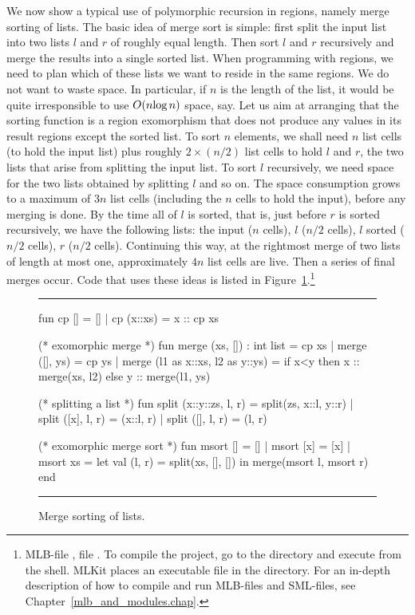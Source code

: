 \documentclass[12pt]{book}
\begin{document}
We now show a typical use of polymorphic recursion in regions, namely merge
sorting of lists. The basic idea of merge sort is simple: first split the input
list into two lists $l$ and $r$ of roughly equal length.  Then sort $l$ and $r$
recursively and merge the results into a single sorted list.  When programming
with regions, we need to plan which of these lists we want to reside in the same
regions. We do not want to waste space. In particular, if $n$ is the length of
the list, it would be quite irresponsible to use $O(n\hbox{log}\,n)$ space, say.
Let us aim at arranging that the sorting function is a region exomorphism that
does not produce any values in its result regions except the sorted list. To
sort $n$ elements, we shall need $n$ list cells (to hold the input list) plus
roughly $2\times(n/2)$ list cells to hold $l$ and $r$, the two lists that arise
from splitting the input list. To sort $l$ recursively, we need space for the
two lists obtained by splitting $l$ and so on. The space consumption grows to a
maximum of $3n$ list cells (including the $n$ cells to hold the input), before
any merging is done.  By the time all of $l$ is sorted, that is, just before $r$
is sorted recursively, we have the following lists: the input ($n$ cells), $l$
($n/2$ cells), $l$ sorted ($n/2$ cells), $r$ ($n/2$ cells). Continuing this way,
at the rightmost merge of two lists of length at most one, approximately $4n$
list cells are live.  Then a series of final merges occur.  Code that uses these
ideas is listed in
%
%
%
%
%
%
Figure~\ref{msort.fig}.\footnote{MLB-file , file
. To compile the project, go to the 
directory and execute  from the shell. MLKit places
an executable file  in the  directory. For an
in-depth description of how to compile and run MLB-files and SML-files, see
Chapter~\ref{mlb_and_modules.chap}.}
\begin{figure}[hbt]
\hrule
\medskip
\begin{smlcode}
  fun cp [] = []
    | cp (x::xs) = x :: cp xs

  (* exomorphic merge *)
  fun merge (xs, []) : int list = cp xs
    | merge ([], ys) = cp ys
    | merge (l1 as x::xs, l2 as y::ys) =
       if x<y then x :: merge(xs, l2)
       else y :: merge(l1, ys)

  (* splitting a list *)
  fun split (x::y::zs, l, r) = split(zs, x::l, y::r)
    | split ([x], l, r) = (x::l, r)
    | split ([], l, r) = (l, r)

  (* exomorphic merge sort *)
  fun msort []  = []
    | msort [x] = [x]
    | msort xs = let val (l, r) = split(xs, [], [])
                 in merge(msort l, msort r)
                 end
\end{smlcode}
\caption{Merge sorting of lists.}
\label{msort.fig}
\medskip\hrule
\end{figure}
\end{document}
